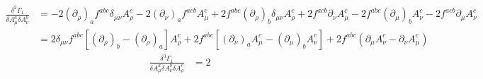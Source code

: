 \documentclass[UTF8]{article}
\begin{document}
\begin{equation}
\begin{split}
\frac{\delta^2\Gamma_1}{\delta A^{a}_{\mu}\delta A^{b}_{\nu}}&=-2(\partial_\rho)_af^{abc}\delta_{\mu\nu}A^{c}_{\rho}-2(\partial_\nu)_af^{acb}A^{c}_{\mu}
+2f^{abc}(\partial_\rho)_b\delta_{\mu\nu}A^{c}_{\rho}+2f^{acb}\partial_\nu A^{c}_{\mu}-2f^{abc}(\partial_\mu)_bA^{c}_{\nu}-2f^{acb}\partial_\mu A^{c}_{\nu}\\
&=2\delta_{\mu\nu}f^{abc}[(\partial_\rho)_b-(\partial_\rho)_a]A^{c}_{\rho}+2f^{abc}[(\partial_\nu)_aA^{c}_{\mu}-(\partial_\mu)_bA^{c}_{\nu}]+2f^{abc}
(\partial_\mu A^{c}_{\nu}-\partial_\nu A^{c}_{\mu})
\end{split}
\end{equation}
\begin{equation}
\begin{split}
\frac{\delta^3\Gamma_1}{\delta A^{a}_{\mu}\delta A^{b}_{\nu}\delta A^{c}_{\rho}}&=2
\end{split}
\end{equation}
\end{document}
